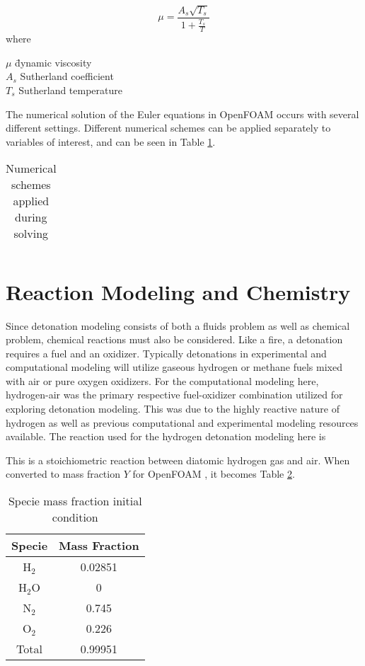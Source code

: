 \begin{equation}
\mu = \frac{A_s \sqrt{T_s}}{1 + \frac{T_s}{T}} 
\end{equation}
where
\begin{tabbing}
\qquad \= \(\mu\) \qquad \= dynamic viscosity\\ 
\> \(A_s\) \> Sutherland coefficient \\
\> \(T_s\) \> Sutherland temperature\\
\end{tabbing}
The numerical solution of the Euler equations in OpenFOAM occurs with several different settings. Different numerical schemes can be applied separately to variables of interest, and can be seen in Table \ref{tab:numschemes}. 

\begin{table}[h]
\centering
\caption{Numerical schemes applied during solving}
\label{tab:numschemes}
\begin{tabular}{cc}
\end{tabular}
\end{table}



\section{Reaction Modeling and Chemistry}
Since detonation modeling consists of both a fluids problem as well as chemical problem, chemical reactions must also be considered. Like a fire, a detonation requires a fuel and an oxidizer. Typically detonations in experimental and computational modeling will utilize gaseous hydrogen or methane fuels mixed with air or pure oxygen oxidizers. For the computational modeling here, hydrogen-air was the primary respective fuel-oxidizer combination utilized for exploring detonation modeling. This was due to the highly reactive nature of hydrogen as well as previous computational and experimental modeling resources available. The reaction used \cite{kuo} for the hydrogen detonation modeling here is
\begin{center}
\end{center}
This is a stoichiometric reaction between diatomic hydrogen gas and air. When converted to mass fraction \(Y\) for OpenFOAM \cite{marcantoni}, it becomes Table \ref{tab:y}.
\begin{table}[H]
\centering
\caption{Specie mass fraction initial condition}
\label{tab:y}
\begin{tabular}{cc}
Specie & Mass Fraction \\ \hline
H\(_2\) & 0.02851 \\ 
H\(_2\)O & 0 \\
N\(_2\) & 0.745 \\ 
O\(_2\) & 0.226 \\ 
Total & 0.99951 \\ 
\end{tabular}
\end{table}

